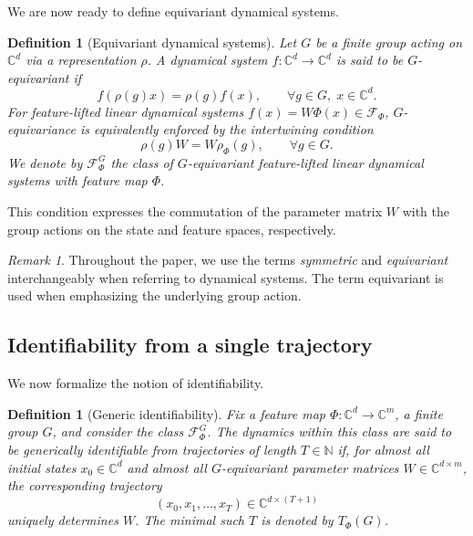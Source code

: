 \documentclass[11pt]{article}
\theoremstyle{plain}
\newtheorem{definition}[theorem]{Definition}
\theoremstyle{definition}
\theoremstyle{remark}
\newtheorem{remark}[theorem]{Remark}
\begin{document}
We are now ready to define equivariant dynamical systems.

\begin{definition}[Equivariant dynamical systems]
Let \(G\) be a finite group acting on \(\mathbb C^d\) via a representation \(\rho\). A dynamical system \(f:\mathbb C^d\to\mathbb C^d\) is said to be \emph{\(G\)-equivariant} if
\begin{equation}
    f(\rho(g)x)=\rho(g)f(x),
    \qquad \forall g\in G,\; x\in\mathbb C^d.
\end{equation}
For feature-lifted linear dynamical systems \(f(x)=W\Phi(x)\in\mathcal F_\Phi\), \(G\)-equivariance is equivalently enforced by the intertwining condition
\[
    \rho(g)W=W\rho_\Phi(g),
    \qquad \forall g\in G.
\]
We denote by \(\mathcal F_\Phi^G\) the class of \(G\)-equivariant feature-lifted linear dynamical systems with feature map \(\Phi\).
\end{definition}

This condition expresses the commutation of the parameter matrix \(W\) with the group actions on the state and feature spaces, respectively.

\begin{remark}
Throughout the paper, we use the terms \emph{symmetric} and \emph{equivariant} interchangeably when referring to dynamical systems. The term equivariant is used when emphasizing the underlying group action.
\end{remark}

\subsection{Identifiability from a single trajectory}

We now formalize the notion of identifiability.

\begin{definition}[Generic identifiability]
Fix a feature map \(\Phi:\mathbb C^d\to\mathbb C^m\), a finite group \(G\), and consider the class \(\mathcal F_\Phi^G\). The dynamics within this class are said to be \emph{generically identifiable from trajectories of length \(T\in\mathbb N\)} if, for almost all initial states \(x_0\in\mathbb C^d\) and almost all \(G\)-equivariant parameter matrices \(W\in\mathbb C^{d\times m}\), the corresponding trajectory
\[
(x_0,x_1,\ldots,x_T)\in\mathbb C^{d\times (T+1)}
\]
uniquely determines \(W\). The minimal such \(T\) is denoted by \(T_\Phi(G)\).
\end{definition}
\end{document}
